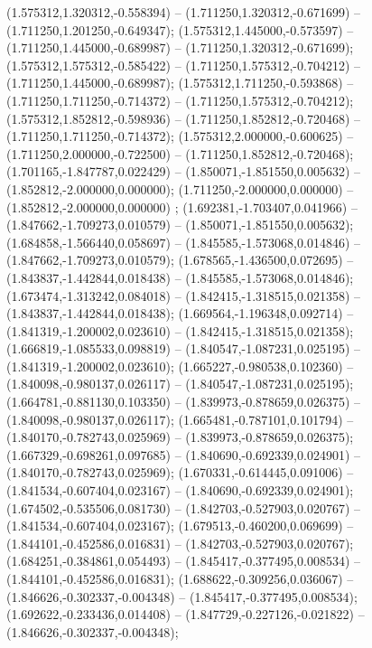  (1.575312,1.320312,-0.558394) -- (1.711250,1.320312,-0.671699) -- (1.711250,1.201250,-0.649347);
 (1.575312,1.445000,-0.573597) -- (1.711250,1.445000,-0.689987) -- (1.711250,1.320312,-0.671699);
 (1.575312,1.575312,-0.585422) -- (1.711250,1.575312,-0.704212) -- (1.711250,1.445000,-0.689987);
 (1.575312,1.711250,-0.593868) -- (1.711250,1.711250,-0.714372) -- (1.711250,1.575312,-0.704212);
 (1.575312,1.852812,-0.598936) -- (1.711250,1.852812,-0.720468) -- (1.711250,1.711250,-0.714372);
 (1.575312,2.000000,-0.600625) -- (1.711250,2.000000,-0.722500) -- (1.711250,1.852812,-0.720468);
 (1.701165,-1.847787,0.022429) -- (1.850071,-1.851550,0.005632) -- (1.852812,-2.000000,0.000000);
 (1.711250,-2.000000,0.000000) -- (1.852812,-2.000000,0.000000) ;
 (1.692381,-1.703407,0.041966) -- (1.847662,-1.709273,0.010579) -- (1.850071,-1.851550,0.005632);
 (1.684858,-1.566440,0.058697) -- (1.845585,-1.573068,0.014846) -- (1.847662,-1.709273,0.010579);
 (1.678565,-1.436500,0.072695) -- (1.843837,-1.442844,0.018438) -- (1.845585,-1.573068,0.014846);
 (1.673474,-1.313242,0.084018) -- (1.842415,-1.318515,0.021358) -- (1.843837,-1.442844,0.018438);
 (1.669564,-1.196348,0.092714) -- (1.841319,-1.200002,0.023610) -- (1.842415,-1.318515,0.021358);
 (1.666819,-1.085533,0.098819) -- (1.840547,-1.087231,0.025195) -- (1.841319,-1.200002,0.023610);
 (1.665227,-0.980538,0.102360) -- (1.840098,-0.980137,0.026117) -- (1.840547,-1.087231,0.025195);
 (1.664781,-0.881130,0.103350) -- (1.839973,-0.878659,0.026375) -- (1.840098,-0.980137,0.026117);
 (1.665481,-0.787101,0.101794) -- (1.840170,-0.782743,0.025969) -- (1.839973,-0.878659,0.026375);
 (1.667329,-0.698261,0.097685) -- (1.840690,-0.692339,0.024901) -- (1.840170,-0.782743,0.025969);
 (1.670331,-0.614445,0.091006) -- (1.841534,-0.607404,0.023167) -- (1.840690,-0.692339,0.024901);
 (1.674502,-0.535506,0.081730) -- (1.842703,-0.527903,0.020767) -- (1.841534,-0.607404,0.023167);
 (1.679513,-0.460200,0.069699) -- (1.844101,-0.452586,0.016831) -- (1.842703,-0.527903,0.020767);
 (1.684251,-0.384861,0.054493) -- (1.845417,-0.377495,0.008534) -- (1.844101,-0.452586,0.016831);
 (1.688622,-0.309256,0.036067) -- (1.846626,-0.302337,-0.004348) -- (1.845417,-0.377495,0.008534);
 (1.692622,-0.233436,0.014408) -- (1.847729,-0.227126,-0.021822) -- (1.846626,-0.302337,-0.004348);
